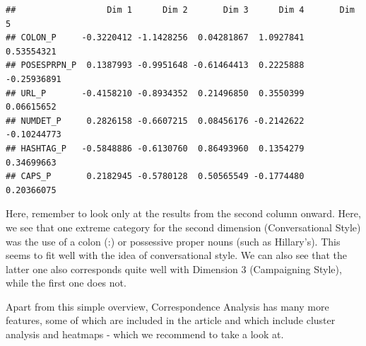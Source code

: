 \documentclass[
]{book}
\begin{document}
\begin{verbatim}
##                  Dim 1      Dim 2       Dim 3      Dim 4       Dim 5
## COLON_P     -0.3220412 -1.1428256  0.04281867  1.0927841  0.53554321
## POSESPRPN_P  0.1387993 -0.9951648 -0.61464413  0.2225888 -0.25936891
## URL_P       -0.4158210 -0.8934352  0.21496850  0.3550399  0.06615652
## NUMDET_P     0.2826158 -0.6607215  0.08456176 -0.2142622 -0.10244773
## HASHTAG_P   -0.5848886 -0.6130760  0.86493960  0.1354279  0.34699663
## CAPS_P       0.2182945 -0.5780128  0.50565549 -0.1774480  0.20366075
\end{verbatim}

Here, remember to look only at the results from the second column onward. Here, we see that one extreme category for the second dimension (Conversational Style) was the use of a colon (:) or possessive proper nouns (such as Hillary's). This seems to fit well with the idea of conversational style. We can also see that the latter one also corresponds quite well with Dimension 3 (Campaigning Style), while the first one does not.

Apart from this simple overview, Correspondence Analysis has many more features, some of which are included in the article and which include cluster analysis and heatmaps - which we recommend to take a look at.
\end{document}
